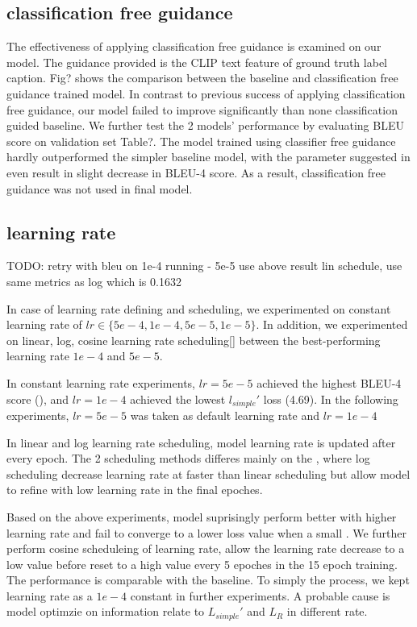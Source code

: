 \documentclass{article}
\begin{document}
\subsection{classification free guidance}
The effectiveness of applying classification free guidance is examined on our model. The guidance provided is the CLIP text feature of ground truth label caption. Fig? shows the comparison between the baseline and classification free guidance trained model. In contrast to previous success of applying classification free guidance, our model failed to improve significantly than none classification guided baseline. We further test the 2 models' performance by evaluating BLEU score on validation set Table?. The model trained using classifier free guidance hardly outperformed the simpler baseline model, with the parameter suggested in \cite{classifier-free} even result in slight decrease in BLEU-4 score. As a result, classification free guidance was not used in final model.

\subsection{learning rate}
TODO: retry with bleu on 1e-4 running  - 5e-5 use above result
lin schedule, use same metrics as log which is 0.1632

In case of learning rate defining and scheduling, we experimented on constant learning rate of $lr \in \{5e-4, 1e-4, 5e-5, 1e-5\}$. In addition, we experimented on linear, log, cosine learning rate scheduling[] between the best-performing learning rate $1e-4$ and $5e-5$. 

In constant learning rate experiments, $lr = 5e-5$ achieved the highest BLEU-4 score (), and $lr = 1e-4$ achieved the lowest $l_{simple}'$ loss (4.69). In the following experiments, $lr = 5e-5$ was taken as default learning rate and $lr = 1e-4$

In linear and log learning rate scheduling, model learning rate is updated after every epoch. The 2 scheduling methods differes mainly on the , where log scheduling decrease learning rate at faster than linear scheduling but allow model to refine with low learning rate in the final epoches. 

Based on the above experiments, model suprisingly perform better with higher learning rate and fail to converge to a lower loss value when a small . We further perform cosine scheduleing of learning rate, allow the learning rate decrease to a low value before reset to a high value every 5 epoches in the 15 epoch training. The performance is comparable with the baseline. To simply the process, we kept learning rate as a $1e-4$ constant in further experiments. A probable cause is model optimzie on information relate to $L_{simple}'$ and $L_R$ in different rate. 
\end{document}
